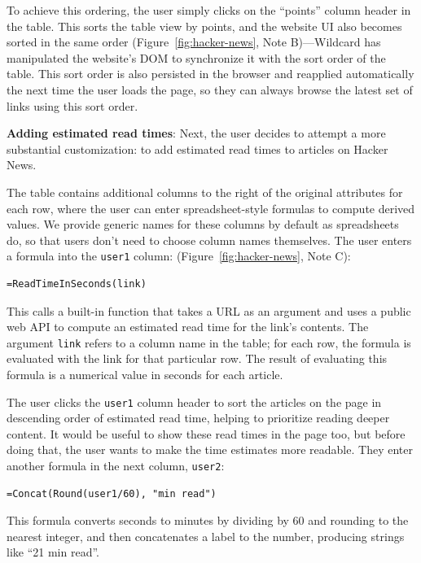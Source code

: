 \documentclass[sigplan,screen,10pt,anonymous,review]{acmart}
\begin{document}
To achieve this ordering, the user simply clicks on the ``points''
column header in the table. This sorts the table view by points, and the
website UI also becomes sorted in the same order
(Figure~\ref{fig:hacker-news}, Note B)---Wildcard has manipulated the
website's DOM to synchronize it with the sort order of the table. This
sort order is also persisted in the browser and reapplied automatically
the next time the user loads the page, so they can always browse the
latest set of links using this sort order.

\textbf{Adding estimated read times}: Next, the user decides to attempt
a more substantial customization: to add estimated read times to
articles on Hacker News.

The table contains additional columns to the right of the original
attributes for each row, where the user can enter spreadsheet-style
formulas to compute derived values. We provide generic names for these
columns by default as spreadsheets do, so that users don't need to
choose column names themselves. The user enters a formula into the
\texttt{user1} column: (Figure~\ref{fig:hacker-news}, Note C):

\begin{verbatim}
=ReadTimeInSeconds(link)
\end{verbatim}

This calls a built-in function that takes a URL as an argument and uses
a public web API to compute an estimated read time for the link's
contents. The argument \texttt{link} refers to a column name in the
table; for each row, the formula is evaluated with the link for that
particular row. The result of evaluating this formula is a numerical
value in seconds for each article.

The user clicks the \texttt{user1} column header to sort the articles on
the page in descending order of estimated read time, helping to
prioritize reading deeper content. It would be useful to show these read
times in the page too, but before doing that, the user wants to make the
time estimates more readable. They enter another formula in the next
column, \texttt{user2}:

\begin{verbatim}
=Concat(Round(user1/60), "min read")
\end{verbatim}

This formula converts seconds to minutes by dividing by 60 and rounding
to the nearest integer, and then concatenates a label to the number,
producing strings like ``21 min read''.
\end{document}
